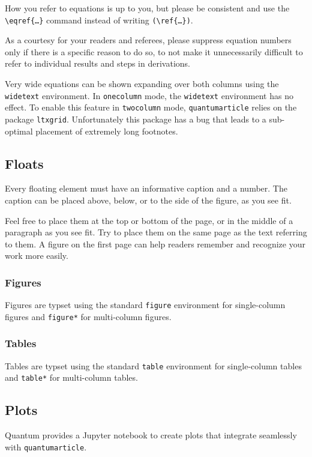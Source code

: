 \documentclass[a4paper,noarxiv,onecolumn]{quantumarticle}
\begin{document}
	How you refer to equations is up to you, but please be consistent and use the \texttt{\textbackslash{}eqref\{\dots\}} command instead of writing \texttt{(\textbackslash{}ref\{\dots\})}.
	
	As a courtesy for your readers and referees, please suppress equation numbers only if there is a specific reason to do so, to not make it unnecessarily difficult to refer to individual results and steps in derivations.
	
	Very wide equations can be shown expanding over both columns using the \texttt{widetext} environment.
	In \texttt{onecolumn} mode, the \texttt{widetext} environment has no effect.
	To enable this feature in \texttt{twocolumn} mode, \texttt{quantumarticle} relies on the package \texttt{ltxgrid}.
	Unfortunately this package has a bug that leads to a sub-optimal placement of extremely long footnotes.
	
	\subsection{Floats}	
	Every floating element must have an informative caption and a number. The caption can be placed above, below, or to the side of the figure, as you see fit.
	
	Feel free to place them at the top or bottom of the page, or in the middle of a paragraph as you see fit. Try to place them on the same page as the text referring to them. A figure on the first page can help readers remember and recognize your work more easily.
	
	\subsubsection{Figures}
	Figures are typset using the standard \texttt{figure} environment for single-column figures and \texttt{figure*} for multi-column figures. 
	
	\subsubsection{Tables}
	Tables are typset using the standard \texttt{table} environment for single-column tables and \texttt{table*} for multi-column tables. 
	
	\subsection{Plots}
	Quantum provides a Jupyter notebook to create plots that integrate seamlessly with \texttt{quantumarticle}.
	
\end{document}
